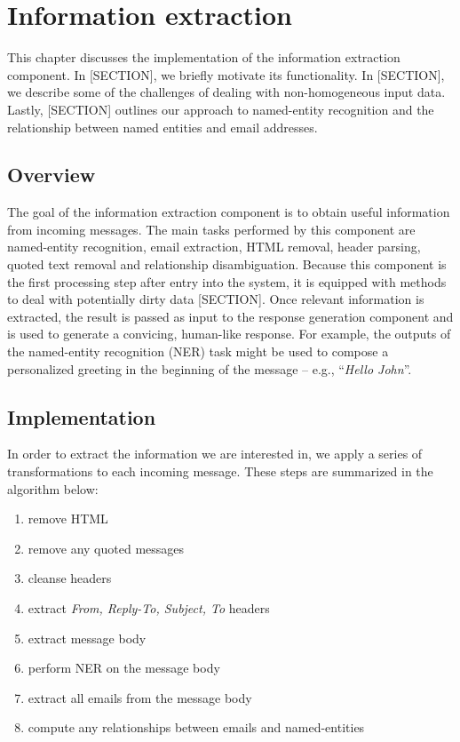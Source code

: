 \chapter{Information extraction}
This chapter discusses the implementation of the information extraction component. In [SECTION], we briefly motivate its functionality. In [SECTION], we describe some of the challenges of dealing with non-homogeneous input data. Lastly, [SECTION] outlines our approach to named-entity recognition and the relationship between named entities and email addresses.

\section{Overview}
The goal of the information extraction component is to obtain useful information from incoming messages. The main tasks performed by this component are named-entity recognition, email extraction, HTML removal, header parsing, quoted text removal and relationship disambiguation. Because this component is the first processing step after entry into the system, it is equipped with methods to deal with potentially dirty data [SECTION]. Once relevant information is extracted, the result is passed as input to the response generation component and is used to generate a convicing, human-like response. For example, the outputs of the named-entity recognition (NER) task might be used to compose a personalized greeting in the beginning of the message -- e.g., ``\textit{Hello John}''.

\section{Implementation}
In order to extract the information we are interested in, we apply a series of transformations to each incoming message. These steps are summarized in the algorithm below:
\begin{enumerate}
\item remove HTML %
\vspace{-5mm}
\item remove any quoted messages %
\vspace{-5mm}
\item cleanse headers %
\vspace{-5mm}
\item extract \textit{From, Reply-To, Subject, To} headers %
\vspace{-5mm}
\item extract message body %
\vspace{-5mm}
\item perform NER on the message body %
\vspace{-5mm}
\item extract all emails from the message body %
\vspace{-5mm}
\item compute any relationships between emails and named-entities %
\end{enumerate}

